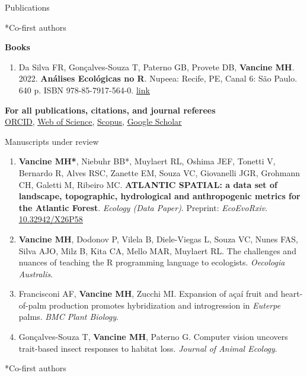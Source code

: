 \documentclass{resume}
\begin{document}
\begin{rSection}{Publications}
\begin{enumerate}
\end{enumerate} 

*Co-first authors

{\bf Books}

\begin{enumerate} 
\item Da Silva FR, Gonçalves-Souza T, Paterno GB, Provete DB, {\bf Vancine MH}. 2022. {\bf Análises Ecológicas no R}. Nupeea: Recife, PE, Canal 6: São Paulo. 640 p. ISBN 978-85-7917-564-0. \href{https://analises-ecologicas.com/}{\underline{link}}
\end{enumerate} 

{\bf For all publications, citations, and journal referees}
\\\href{https://orcid.org/0000-0001-9650-7575}{\underline{ORCID}}, \href{https://www.webofscience.com/wos/author/record/837504}{\underline{Web of Science}}, \href{https://www.scopus.com/authid/detail.uri?authorId=57193451888}{\underline{Scopus}}, \href{https://scholar.google.com/citations?user=i-2xZBQAAAAJ}{\underline{Google Scholar}}

\end{rSection}


\begin{rSection}{Manuscripts under review}

\begin{enumerate} 

\item {\bf Vancine MH*}, Niebuhr BB*, Muylaert RL, Oshima JEF, Tonetti V, Bernardo R, Alves RSC, Zanette EM, Souza VC, Giovanelli JGR, Grohmann CH, Galetti M, Ribeiro MC. {\bf ATLANTIC SPATIAL: a data set of landscape, topographic, hydrological and anthropogenic metrics for the Atlantic Forest}. {\it Ecology (Data Paper)}. Preprint: {\it EcoEvoRxiv}. \href{https://doi.org/10.32942/X26P58}{\underline{10.32942/X26P58}}

\item {\bf Vancine MH}, Dodonov P, Vilela B, Diele-Viegas L, Souza VC, Nunes FAS, Silva AJO, Milz B, Kita CA, Mello MAR, Muylaert RL. The challenges and nuances of teaching the R programming language to ecologists. {\it Oecologia Australis}.

\item Francisconi AF, {\bf Vancine MH}, Zucchi MI. Expansion of açaí fruit and heart-of-palm production promotes hybridization and introgression in {\it Euterpe} palms. {\it BMC Plant Biology}.

\item Gonçalves-Souza T, {\bf Vancine MH}, Paterno G. Computer vision uncovers trait-based insect responses to habitat loss. {\it Journal of Animal Ecology}. 

\end{enumerate} 

*Co-first authors

\end{rSection}
\end{document}
